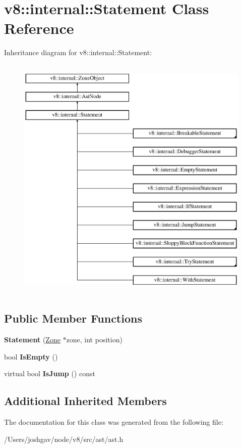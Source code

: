 \hypertarget{classv8_1_1internal_1_1_statement}{}\section{v8\+:\+:internal\+:\+:Statement Class Reference}
\label{classv8_1_1internal_1_1_statement}
Inheritance diagram for v8\+:\+:internal\+:\+:Statement\+:\begin{figure}[H]
\begin{center}
\leavevmode
\includegraphics[height=12.000000cm]{classv8_1_1internal_1_1_statement}
\end{center}
\end{figure}
\subsection*{Public Member Functions}
\begin{DoxyCompactItemize}
\item 
{\bfseries Statement} (\hyperlink{classv8_1_1internal_1_1_zone}{Zone} $\ast$zone, int position)\hypertarget{classv8_1_1internal_1_1_statement_a4ad4746acdde76b4fc471b3cb8cb8900}{}\label{classv8_1_1internal_1_1_statement_a4ad4746acdde76b4fc471b3cb8cb8900}

\item 
bool {\bfseries Is\+Empty} ()\hypertarget{classv8_1_1internal_1_1_statement_a8cfc3abbe3a50c3015fbef78229bbd9b}{}\label{classv8_1_1internal_1_1_statement_a8cfc3abbe3a50c3015fbef78229bbd9b}

\item 
virtual bool {\bfseries Is\+Jump} () const \hypertarget{classv8_1_1internal_1_1_statement_a36e6af4fa712db69316a227ec8570cf3}{}\label{classv8_1_1internal_1_1_statement_a36e6af4fa712db69316a227ec8570cf3}

\end{DoxyCompactItemize}
\subsection*{Additional Inherited Members}


The documentation for this class was generated from the following file\+:\begin{DoxyCompactItemize}
\item 
/\+Users/joshgav/node/v8/src/ast/ast.\+h\end{DoxyCompactItemize}
